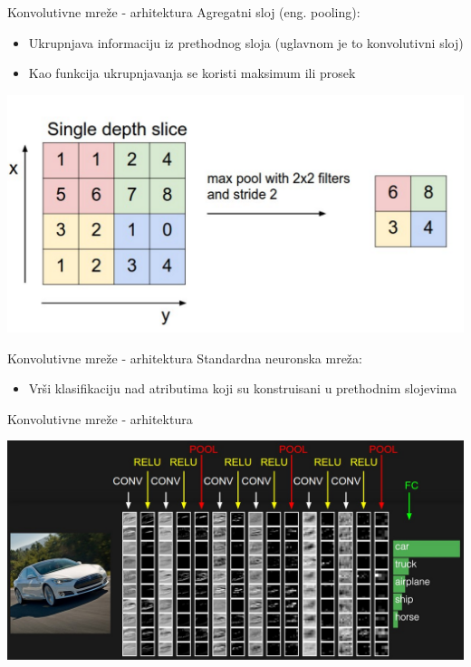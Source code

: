 \documentclass{beamer}
\begin{document}
\begin{frame}{Konvolutivne mreže - arhitektura}
    Agregatni sloj (eng. pooling):
    \begin{itemize}
        \item Ukrupnjava informaciju iz prethodnog sloja (uglavnom je to konvolutivni sloj)
        \item Kao funkcija ukrupnjavanja se koristi maksimum ili prosek
    \end{itemize}

    \begin{center}
        \includegraphics[width=\textwidth]{./slike/maxpooling.png}
    \end{center}
\end{frame}
\begin{frame}{Konvolutivne mreže - arhitektura}
    Standardna neuronska mreža:
    \begin{itemize}
        \item Vrši klasifikaciju nad atributima koji su konstruisani u prethodnim slojevima
    \end{itemize}
\end{frame}
\begin{frame}{Konvolutivne mreže - arhitektura}
    \begin{center}
        \includegraphics[width=\textwidth]{./slike/convnet01.jpeg}
    \end{center}
\end{frame}
\end{document}
